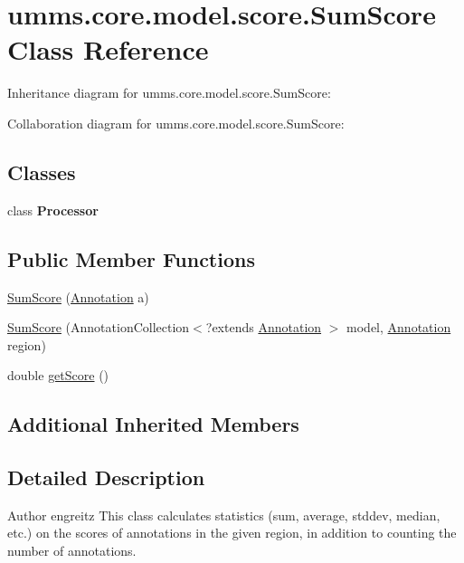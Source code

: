 \hypertarget{classumms_1_1core_1_1model_1_1score_1_1_sum_score}{\section{umms.\+core.\+model.\+score.\+Sum\+Score Class Reference}
\label{classumms_1_1core_1_1model_1_1score_1_1_sum_score}
}


Inheritance diagram for umms.\+core.\+model.\+score.\+Sum\+Score\+:


Collaboration diagram for umms.\+core.\+model.\+score.\+Sum\+Score\+:
\subsection*{Classes}
\begin{DoxyCompactItemize}
\item 
class {\bfseries Processor}
\end{DoxyCompactItemize}
\subsection*{Public Member Functions}
\begin{DoxyCompactItemize}
\item 
\hyperlink{classumms_1_1core_1_1model_1_1score_1_1_sum_score_ad6cc66137c6966b2483e6400439b6e70}{Sum\+Score} (\hyperlink{interfaceumms_1_1core_1_1annotation_1_1_annotation}{Annotation} a)
\item 
\hyperlink{classumms_1_1core_1_1model_1_1score_1_1_sum_score_af49a51996293c1cd5e465a4d7f61fe00}{Sum\+Score} (Annotation\+Collection$<$?extends \hyperlink{interfaceumms_1_1core_1_1annotation_1_1_annotation}{Annotation} $>$ model, \hyperlink{interfaceumms_1_1core_1_1annotation_1_1_annotation}{Annotation} region)
\item 
double \hyperlink{classumms_1_1core_1_1model_1_1score_1_1_sum_score_af2ac743d89d631a5f6bf69d6bd74db8a}{get\+Score} ()
\end{DoxyCompactItemize}
\subsection*{Additional Inherited Members}


\subsection{Detailed Description}
\begin{DoxyAuthor}{Author}
engreitz This class calculates statistics (sum, average, stddev, median, etc.) on the scores of annotations in the given region, in addition to counting the number of annotations. 
\end{DoxyAuthor}


